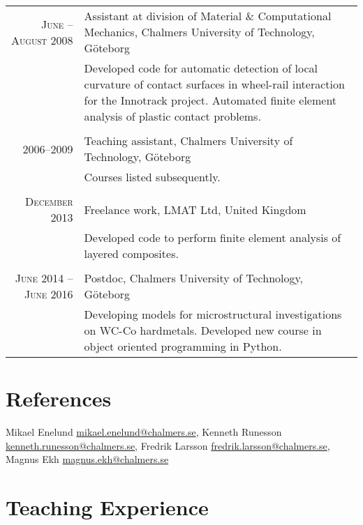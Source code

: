 \documentclass[a4paper,10pt]{article} %
\begin{document}
{\begin{tabular}{r|p{11cm}}
\textsc{June -- August 2008} & Assistant at division of Material \& Computational Mechanics, Chalmers University of Technology, Göteborg\\
& \footnotesize{Developed code for automatic detection of local curvature of contact surfaces in wheel-rail interaction for the Innotrack project. Automated finite element analysis of plastic contact problems.}\\
\multicolumn{2}{c}{} \\
\textsc{2006--2009} & Teaching assistant, Chalmers University of Technology, Göteborg\\
& \footnotesize{Courses listed subsequently.}\\
\multicolumn{2}{c}{} \\
\textsc{December 2013} & Freelance work, LMAT Ltd, United Kingdom\\
& \footnotesize{Developed code to perform finite element analysis of layered composites.}\\
\multicolumn{2}{c}{} \\
\textsc{June 2014 -- June 2016} & Postdoc, Chalmers University of Technology, Göteborg\\
& \footnotesize{Developing models for microstructural investigations on WC-Co hardmetals.
  Developed new course in object oriented programming in Python.}\\

\end{tabular}


\section{References}
Mikael Enelund \href{mailto:mikael.enelund@chalmers.se}{mikael.enelund@chalmers.se}, 
Kenneth Runesson \href{mailto:kenneth.runesson@chalmers.se}{kenneth.runesson@chalmers.se}, 
Fredrik Larsson \href{mailto:fredrik.larsson@chalmers.se}{fredrik.larsson@chalmers.se},
Magnus Ekh \href{mailto:magnus.ekh@chalmers.se}{magnus.ekh@chalmers.se}



\section{Teaching Experience}

}
\end{document}
